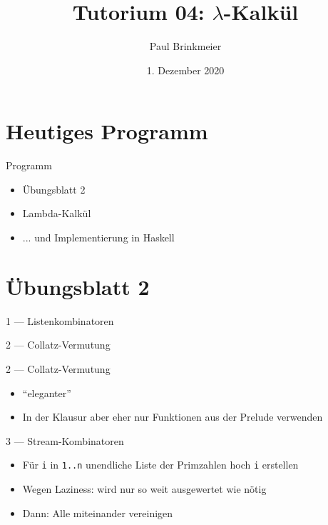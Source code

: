 \documentclass{beamer}
\title{Tutorium 04: $\lambda$-Kalkül}
\author{Paul Brinkmeier}
\institute{Tutorium Programmierparadigmen am KIT}
\date{1. Dezember 2020}
\begin{document}
\begin{frame}
	\titlepage
\end{frame}

\section{Heutiges Programm}
\begin{frame}{Programm}
	\begin{itemize}
		\item Übungsblatt 2
		\item Lambda-Kalkül
                \item ... und Implementierung in Haskell
	\end{itemize}
\end{frame}

\section{Übungsblatt 2}

\begin{frame}{1 --- Listenkombinatoren}
\end{frame}

\begin{frame}{2 --- Collatz-Vermutung}
\end{frame}

\begin{frame}{2 --- Collatz-Vermutung}

	\begin{itemize}
		\item \enquote{eleganter}
		\item In der Klausur aber eher nur Funktionen aus der Prelude verwenden
	\end{itemize}
\end{frame}

\begin{frame}{3 --- Stream-Kombinatoren}

	\begin{itemize}
		\item Für \texttt{i} in \texttt{1..n} unendliche Liste der Primzahlen hoch \texttt{i} erstellen
		\item Wegen Laziness: wird nur so weit ausgewertet wie nötig
		\item Dann: Alle miteinander vereinigen
	\end{itemize}
\end{frame}
\end{document}
